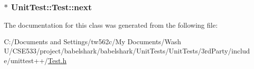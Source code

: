 \hypertarget{class_unit_test_1_1_test_f14837fa08df9cdedb560b4deadec8a4}{
\subsubsection[{next}]{$\ast$ {\bf UnitTest::Test::next}}}
\label{class_unit_test_1_1_test_f14837fa08df9cdedb560b4deadec8a4}




The documentation for this class was generated from the following file:\begin{CompactItemize}
\item 
C:/Documents and Settings/tw562c/My Documents/Wash U/CSE533/project/babelshark/babelshark/UnitTests/UnitTests/3rdParty/include/unittest++/\hyperlink{_test_8h}{Test.h}\end{CompactItemize}
